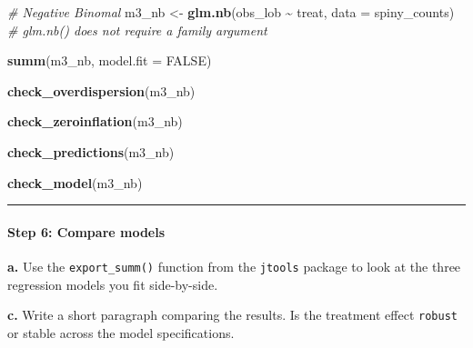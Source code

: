 \documentclass[
]{article}
\newenvironment{Shaded}{\begin{snugshade}}{\end{snugshade}}
\newcommand{\AttributeTok}[1]{\textcolor[rgb]{0.13,0.29,0.53}{#1}}
\newcommand{\CommentTok}[1]{\textcolor[rgb]{0.56,0.35,0.01}{\textit{#1}}}
\newcommand{\ConstantTok}[1]{\textcolor[rgb]{0.56,0.35,0.01}{#1}}
\newcommand{\FunctionTok}[1]{\textcolor[rgb]{0.13,0.29,0.53}{\textbf{#1}}}
\newcommand{\NormalTok}[1]{#1}
\newcommand{\OtherTok}[1]{\textcolor[rgb]{0.56,0.35,0.01}{#1}}
\newcommand{\SpecialCharTok}[1]{\textcolor[rgb]{0.81,0.36,0.00}{\textbf{#1}}}
\begin{document}
\begin{Shaded}
\begin{Highlighting}[]
\CommentTok{\# Negative Binomal }
\NormalTok{m3\_nb }\OtherTok{\textless{}{-}} \FunctionTok{glm.nb}\NormalTok{(obs\_lob }\SpecialCharTok{\textasciitilde{}}\NormalTok{ treat, }\AttributeTok{data =}\NormalTok{ spiny\_counts) }\CommentTok{\# \textasciigrave{}glm.nb()\textasciigrave{}  does not require a \textasciigrave{}family\textasciigrave{} argument}

\FunctionTok{summ}\NormalTok{(m3\_nb, }\AttributeTok{model.fit =} \ConstantTok{FALSE}\NormalTok{)}
\end{Highlighting}
\end{Shaded}

\begin{Shaded}
\begin{Highlighting}[]
\FunctionTok{check\_overdispersion}\NormalTok{(m3\_nb)}

\FunctionTok{check\_zeroinflation}\NormalTok{(m3\_nb)}
\end{Highlighting}
\end{Shaded}

\begin{Shaded}
\begin{Highlighting}[]
\FunctionTok{check\_predictions}\NormalTok{(m3\_nb)}

\FunctionTok{check\_model}\NormalTok{(m3\_nb)}
\end{Highlighting}
\end{Shaded}

\begin{center}\rule{0.5\linewidth}{0.5pt}\end{center}

\paragraph{Step 6: Compare models}\label{step-6-compare-models}

\textbf{a.} Use the \texttt{export\_summ()} function from the
\texttt{jtools} package to look at the three regression models you fit
side-by-side.

\textbf{c.} Write a short paragraph comparing the results. Is the
treatment effect \texttt{robust} or stable across the model
specifications.
\end{document}
